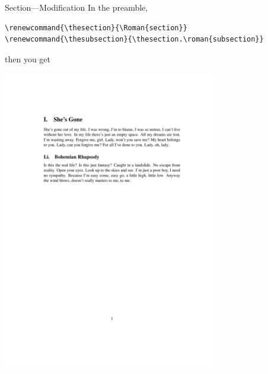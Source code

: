 \documentclass[12pt]{gshs_lecture}
\begin{document}
\begin{frame}[t,fragile]{Section---Modification}\small
In the preamble,
\begin{block}{}
\begin{lstlisting}
\renewcommand{\thesection}{\Roman{section}}
\renewcommand{\thesubsection}{\thesection.\roman{subsection}}
\end{lstlisting}
\end{block}
then you get
\begin{center}
\begin{framed}
\includegraphics[width=0.7\textwidth,trim={0cm 18cm 0cm 4cm},clip]{./test_article/article005.pdf}
\end{framed}
\end{center}
\end{frame}
\end{document}

